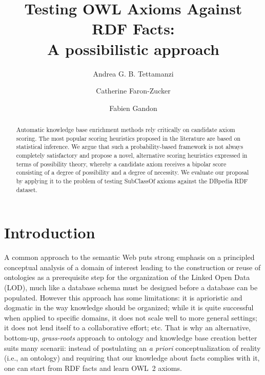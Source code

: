 \documentclass{llncs}
\begin{document}
\title{Testing OWL Axioms Against RDF Facts:\\
A possibilistic approach}


\author{Andrea G. B. Tettamanzi \and Catherine Faron-Zucker \and Fabien Gandon}




\maketitle

\begin{abstract}
Automatic knowledge base enrichment methods rely critically on candidate axiom scoring.
The most popular scoring heuristics proposed in the literature are based on statistical inference.
We argue that such a probability-based framework is not always completely satisfactory
and propose a novel, alternative scoring heuristics expressed in terms of possibility theory,
whereby a candidate axiom receives a bipolar score consisting of a degree of possibility
and a degree of necessity.
We evaluate our proposal by applying it to the problem of testing \textsf{SubClassOf}
axioms against the DBpedia RDF dataset.

\end{abstract}

\section{Introduction}
A common approach to the semantic Web puts strong emphasis
on a principled conceptual analysis of a domain of interest
leading to the construction or reuse of ontologies
as a prerequisite step for the organization of the Linked Open Data (LOD),
much like a database schema must be designed before a database can be populated.
However this approach has some limitations:
it is aprioristic and dogmatic in the way knowledge should be organized;
while it is quite successful when applied to specific domains,
it does not scale well to more general settings;
it does not lend itself to a collaborative effort; etc.
That is why an alternative, bottom-up, \emph{grass-roots} approach to ontology and
knowledge base creation better suits many scenarii: instead of postulating an \emph{a priori}
conceptualization of reality (i.e., an ontology) and requiring that our knowledge
about facts complies with it, one can start from RDF facts and learn OWL~2 axioms.
\end{document}
